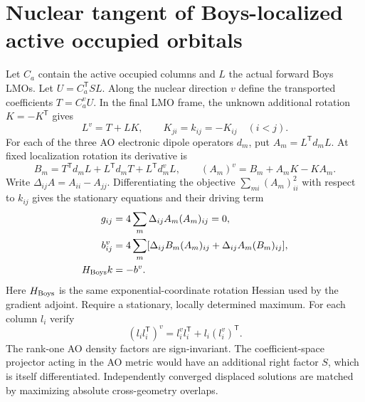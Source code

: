 \documentclass[11pt]{article}
\begin{document}
\section{Nuclear tangent of Boys-localized active occupied orbitals}
Let $C_a$ contain the active occupied columns and $L$ the actual forward
Boys LMOs. Let $U=C_a^{\mathsf T}SL$. Along the nuclear direction $v$
define the transported coefficients $T=C_a^v U$. In the final LMO frame,
the unknown additional rotation $K=-K^{\mathsf T}$ gives
\begin{equation}
 L^v=T+LK,\qquad K_{ji}=k_{ij}=-K_{ij}\quad (i<j).
\end{equation}
For each of the three AO electronic dipole operators $d_m$, put
$A_m=L^{\mathsf T}d_m L$. At fixed localization rotation its derivative is
\begin{equation}
 B_m=T^{\mathsf T}d_m L+L^{\mathsf T}d_m T+L^{\mathsf T}d_m^v L,\qquad
 (A_m)^v=B_m+A_mK-KA_m .
\end{equation}
Write $\Delta_{ij}A=A_{ii}-A_{jj}$. Differentiating the objective
$\sum_{mi}(A_m)_{ii}^2$ with respect to $k_{ij}$ gives the stationary
equations and their driving term
\begin{align}
 g_{ij}&=4\sum_m\Delta_{ij}A_m (A_m)_{ij}=0,\\
 b_{ij}^v&=4\sum_m [\Delta_{ij}B_m (A_m)_{ij}
                      +\Delta_{ij}A_m (B_m)_{ij}],\\
 H_{\rm Boys} k&=-b^v .
\end{align}
Here $H_{\rm Boys}$ is the same exponential-coordinate rotation Hessian used
by the gradient adjoint. Require a stationary, locally determined maximum.
For each column $l_i$ verify
\begin{equation}
 (l_i l_i^{\mathsf T})^v=l_i^v l_i^{\mathsf T}+l_i(l_i^v)^{\mathsf T}.
\end{equation}
The rank-one AO density factors are sign-invariant. The coefficient-space
projector acting in the AO metric would have an additional right factor
$S$, which is itself differentiated. Independently converged displaced
solutions are matched by maximizing absolute cross-geometry overlaps.
\end{document}
